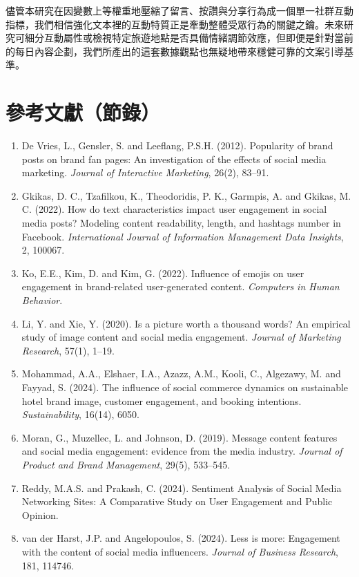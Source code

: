 \documentclass[12pt,a4paper,fontset=none]{ctexart}
\begin{document}
儘管本研究在因變數上等權重地壓縮了留言、按讚與分享行為成一個單一社群互動指標，我們相信強化文本裡的互動特質正是牽動整體受眾行為的關鍵之鑰。未來研究可細分互動屬性或檢視特定旅遊地點是否具備情緒調節效應，但即便是針對當前的每日內容企劃，我們所產出的這套數據觀點也無疑地帶來穩健可靠的文案引導基準。

\section{參考文獻（節錄）}
\begin{enumerate}
    \item De Vries, L., Gensler, S. and Leeflang, P.S.H. (2012). Popularity of brand posts on brand fan pages: An investigation of the effects of social media marketing. \textit{Journal of Interactive Marketing}, 26(2), 83--91.
    \item Gkikas, D. C., Tzafilkou, K., Theodoridis, P. K., Garmpis, A. and Gkikas, M. C. (2022). How do text characteristics impact user engagement in social media posts? Modeling content readability, length, and hashtags number in Facebook. \textit{International Journal of Information Management Data Insights}, 2, 100067.
    \item Ko, E.E., Kim, D. and Kim, G. (2022). Influence of emojis on user engagement in brand-related user-generated content. \textit{Computers in Human Behavior}.
    \item Li, Y. and Xie, Y. (2020). Is a picture worth a thousand words? An empirical study of image content and social media engagement. \textit{Journal of Marketing Research}, 57(1), 1--19.
    \item Mohammad, A.A., Elshaer, I.A., Azazz, A.M., Kooli, C., Algezawy, M. and Fayyad, S. (2024). The influence of social commerce dynamics on sustainable hotel brand image, customer engagement, and booking intentions. \textit{Sustainability}, 16(14), 6050.
    \item Moran, G., Muzellec, L. and Johnson, D. (2019). Message content features and social media engagement: evidence from the media industry. \textit{Journal of Product and Brand Management}, 29(5), 533--545.
    \item Reddy, M.A.S. and Prakash, C. (2024). Sentiment Analysis of Social Media Networking Sites: A Comparative Study on User Engagement and Public Opinion.
    \item van der Harst, J.P. and Angelopoulos, S. (2024). Less is more: Engagement with the content of social media influencers. \textit{Journal of Business Research}, 181, 114746.
\end{enumerate}
\end{document}

